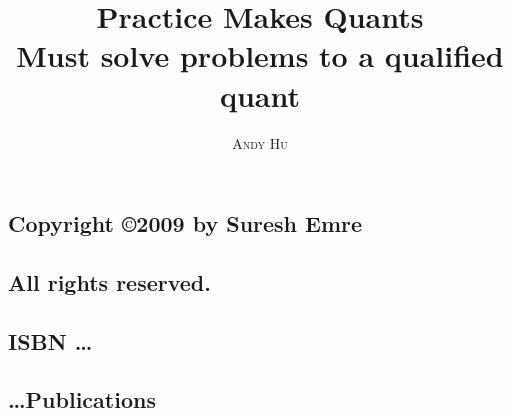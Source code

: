 \documentclass[12pt]{book}
\title{
    \Huge \textbf{Practice Makes Quants} %
    \\
    \small Must solve problems to a qualified quant %
}
\author{\textsc{Andy Hu}} %
\begin{document}
\frontmatter
\maketitle

\newpage
\subsection*{\center \normalsize Copyright \copyright 2009 by Suresh Emre}
\subsection*{\center \normalsize All rights reserved.}
\subsection*{\center \normalsize ISBN \dots}
\subsection*{\center \normalsize \dots Publications}
%
\tableofcontents
%
\mainmatter
%
















\backmatter
\end{document}
